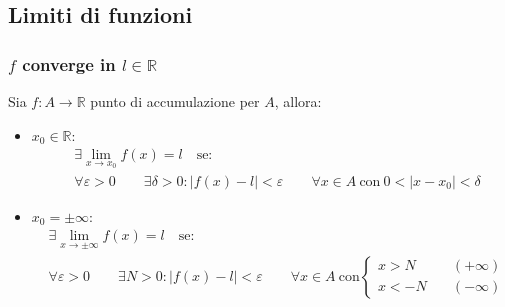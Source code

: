 \subsection{Limiti di funzioni}
\subsubsection{\texorpdfstring{$f$ converge in $l \in \mathbb{R}$}{}}
Sia $f:A\rightarrow\mathbb{R}$ punto di accumulazione per $A$, allora:

\begin{itemize}
    \item $x_0\in\mathbb{R}$:
    \begin{equation}
        \begin{aligned}
            & \exists \lim_{x \to x_0} f(x) = l \quad \text{se:} \\
            & \forall \varepsilon > 0 \qquad \exists \delta > 0 : |f(x) - l| < \varepsilon \qquad \forall x \in A \ \text{con} \ 0 < |x - x_0| < \delta
        \end{aligned}
    \end{equation}
    
    \item $x_0 = \pm\infty$:
    \begin{equation}
        \begin{aligned}
            & \exists \lim_{x \to \pm\infty} f(x) = l \quad \text{se:} \\
            & \forall \varepsilon > 0 \qquad \exists N > 0 : |f(x) - l| < \varepsilon \qquad \forall x \in A \ \text{con} 
            \begin{cases}
                x > N &(+\infty)\\ 
                x < -N\quad&(-\infty)
            \end{cases}
        \end{aligned}
    \end{equation}
\end{itemize}

